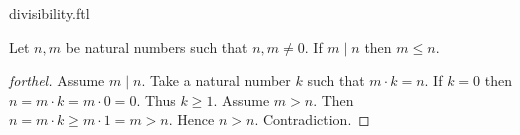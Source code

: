 \documentclass{naproche-library}
\begin{document}
\begin{smodule}[title=Divisibility]{divisibility.ftl}
\begin{proposition}[forthel,id=ARITHMETIC_07_2187144577679360]
  Let $n, m$ be natural numbers such that $n, m \neq 0$.
  If $m \mid n$ then $m \leq n$.
\end{proposition}
\begin{proof}[forthel]
  Assume $m \mid n$.
  Take a natural number $k$ such that $m \cdot k = n$.
  If $k = 0$ then
  $n
    = m \cdot k
    = m \cdot 0
    = 0$.
  Thus $k \geq 1$.
  Assume $m > n$.
  Then $n
    = m \cdot k
    \geq m \cdot 1
    = m
    > n$.
  Hence $n > n$.
  Contradiction.
\end{proof}
\end{smodule}
\end{document}
